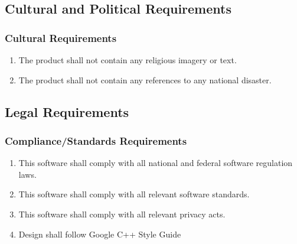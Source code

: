 \documentclass[]{article}
\begin{document}

\subsection{Cultural and Political Requirements}
\label{sub:Cultural_and_Political_Requirements}

\subsubsection{Cultural Requirements}
\label{ssub: Cultural Requirements}
\begin{enumerate}[{LR}1. ]
	\item The product shall not contain any religious imagery or text.
	\item The product shall not contain any references to any national disaster.

\end{enumerate}



\subsection{Legal Requirements}
\label{sub:legal_requirements}

\subsubsection{Compliance/Standards Requirements}
\label{ssub:standards_requirements}
\begin{enumerate}[{LR}1. ]
	\item This software shall comply with all national and federal software regulation laws.
    \item This software shall comply with all relevant software standards.
    \item This software shall comply with all relevant privacy acts.
    \item Design shall follow Google C++ Style Guide
\end{enumerate}

\newpage
\appendix
\end{document}
